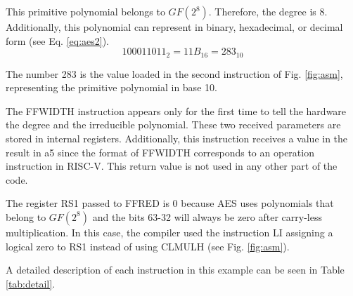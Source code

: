 This primitive polynomial belongs to $GF(2^8)$. Therefore, the degree is 8. Additionally, this polynomial can represent in binary, 
hexadecimal, or decimal form (see Eq. \ref{eq:aes2}). 
\begin{equation}
    100011011_{2}=11B_{16}=283_{10}
    \label{eq:aes2}
\end{equation}


The number 283 is the value loaded in the second instruction of Fig. \ref{fig:asm}, representing the primitive polynomial in base 10.

The FFWIDTH instruction appears only for the first time to tell the hardware 
the degree and the irreducible polynomial. These two received parameters are stored in internal registers. 
Additionally, this instruction receives a value in the result in a5 since the format of FFWIDTH corresponds to an 
operation instruction in RISC-V. This return value is not used in any other part of the code.


The register RS1 passed to FFRED is 0 because AES uses polynomials that belong to $GF(2^8)$ 
and the bits 63-32 will always be zero after carry-less multiplication. In this case, the compiler used the instruction 
LI assigning a logical zero to RS1 instead of using CLMULH (see Fig. \ref{fig:asm}). 

A detailed description of each instruction in this example can be seen in Table \ref{tab:detail}.



